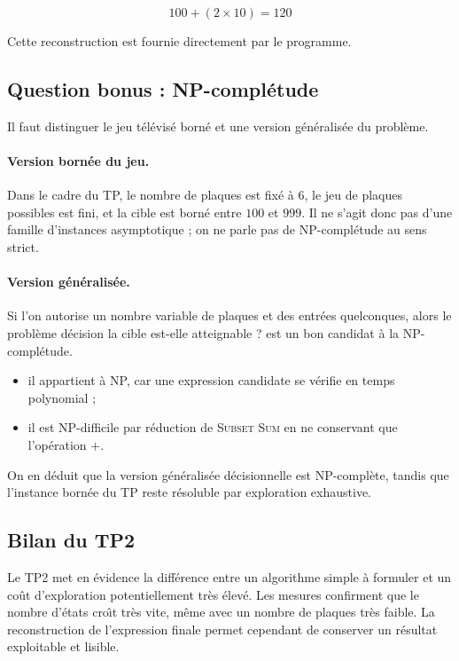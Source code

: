 \[
	100 + (2 \times 10) = 120
\]

Cette reconstruction est fournie directement par le programme.

\subsection{Question bonus : NP-compl\'{e}tude}\label{subsec:tp2-bonus}

Il faut distinguer le jeu t\'{e}l\'{e}vis\'{e} born\'{e} et une version g\'{e}n\'{e}ralis\'{e}e du
probl\`{e}me.

\paragraph{Version born\'{e}e du jeu.}
Dans le cadre du TP, le nombre de plaques est fix\'{e} \`{a} \(6\), le jeu de
plaques possibles est fini, et la cible est born\'{e} entre \(100\) et \(999\).
Il ne s'agit donc pas d'une famille d'instances asymptotique ; on ne parle pas
de NP-compl\'{e}tude au sens strict.

\paragraph{Version g\'{e}n\'{e}ralis\'{e}e.}
Si l'on autorise un nombre variable de plaques et des entr\'{e}es quelconques,
alors le probl\`{e}me d\'{e}cision \og{} la cible est-elle atteignable ? \fg{} est un
bon candidat \`{a} la NP-compl\'{e}tude.

\begin{itemize}
	\item il appartient \`{a} NP, car une expression candidate se v\'{e}rifie en
	      temps polynomial ;
	\item il est NP-difficile par r\'{e}duction de \textsc{Subset Sum} en ne
	      conservant que l'op\'{e}ration \(+\).
\end{itemize}

On en d\'{e}duit que la version g\'{e}n\'{e}ralis\'{e}e d\'{e}cisionnelle est
NP-compl\`{e}te, tandis que l'instance born\'{e}e du TP reste r\'{e}soluble par
exploration exhaustive.

\subsection{Bilan du TP2}\label{subsec:tp2-bilan}

Le TP2 met en \'{e}vidence la diff\'{e}rence entre un algorithme simple \`{a}
formuler et un co\^{u}t d'exploration potentiellement tr\`{e}s \'{e}lev\'{e}.
Les
mesures confirment que le nombre d'\'{e}tats cro\^{\i}t tr\`{e}s vite, m\^{e}me avec un
nombre de plaques tr\`{e}s faible.
La reconstruction de l'expression finale permet
cependant de conserver un r\'{e}sultat exploitable et lisible.
